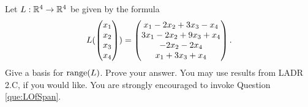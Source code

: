 \begin{question}
	\normalfont
	
	Let $L: {\mathbb R}^4\to{\mathbb R}^4$ be given by the formula
	\begin{align*}
		L(\begin{pmatrix} x_1\\ x_2\\x_3 \\ x_4\end{pmatrix}) = \begin{pmatrix} x_1 - 2x_2 + 3x_3 - x_4\\ 3x_1 -2x_2 + 9x_3 + x_4\\-2x_2 - 2x_4 \\ x_1 + 3x_3 + x_4\end{pmatrix}.
	\end{align*}
	  Give a basis for $\textnormal{range}(L)$.  Prove your answer.  You may use results from LADR 2.C, if you would like.  You are strongly encouraged to invoke Question \ref{que:LOfSpan}.
	
\end{question}